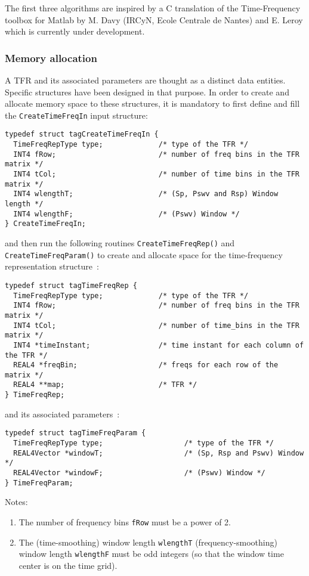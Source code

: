 \documentclass{article}
\begin{document}
The first three algorithms are inspired by a C translation of the
Time-Frequency toolbox for Matlab by M. Davy (IRCyN, Ecole Centrale de
Nantes) and E. Leroy which is currently under development.

\subsubsection{Memory allocation}
A TFR and its associated parameters are thought as a distinct data
entities. Specific structures have been designed in that purpose. In
order to create and allocate memory space to these structures, it is
mandatory to first define and fill the \texttt{CreateTimeFreqIn} input 
structure:
\begin{verbatim}
typedef struct tagCreateTimeFreqIn {
  TimeFreqRepType type;             /* type of the TFR */
  INT4 fRow;                        /* number of freq bins in the TFR matrix */
  INT4 tCol;                        /* number of time bins in the TFR matrix */
  INT4 wlengthT;                    /* (Sp, Pswv and Rsp) Window length */
  INT4 wlengthF;                    /* (Pswv) Window */
} CreateTimeFreqIn;
\end{verbatim}
and then run the following routines \texttt{CreateTimeFreqRep()} and
\texttt{CreateTimeFreqParam()} to create and allocate space for the
time-frequency representation structure~:
\begin{verbatim}
typedef struct tagTimeFreqRep {
  TimeFreqRepType type;             /* type of the TFR */
  INT4 fRow;                        /* number of freq bins in the TFR matrix */
  INT4 tCol;                        /* number of time_bins in the TFR matrix */
  INT4 *timeInstant;                /* time instant for each column of the TFR */
  REAL4 *freqBin;                   /* freqs for each row of the matrix */
  REAL4 **map;                      /* TFR */
} TimeFreqRep;
\end{verbatim}
and its associated parameters~:
\begin{verbatim}
typedef struct tagTimeFreqParam {
  TimeFreqRepType type;                   /* type of the TFR */
  REAL4Vector *windowT;                   /* (Sp, Rsp and Pswv) Window */
  REAL4Vector *windowF;                   /* (Pswv) Window */
} TimeFreqParam;
\end{verbatim}

\vspace{3mm}
Notes:
\begin{enumerate}
\item The number of frequency bins \texttt{fRow} must be a power of 2.
\item The (time-smoothing) window length \texttt{wlengthT}
(frequency-smoothing) window length \texttt{wlengthF} must be odd
integers (so that the window time center is on the time grid).
\end{enumerate}
\end{document}
